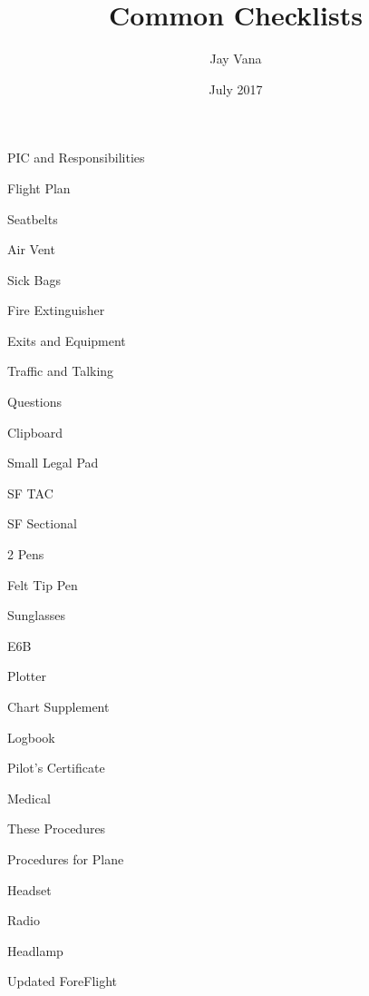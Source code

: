 \documentclass{article}
\title{Common Checklists}
\author{Jay Vana}
\date{July 2017}
\begin{document}
  


  \begin{multicols*}{3}


    \begin{clitemize}
      \item PIC and Responsibilities
      \item Flight Plan
      \item Seatbelts
      \item Air Vent
      \item Sick Bags
      \item Fire Extinguisher
      \item Exits and Equipment
      \item Traffic and Talking
      \item Questions
    \end{clitemize}


    \begin{clitemize}
      \item Clipboard
      \item Small Legal Pad
      \item SF TAC
      \item SF Sectional
      \item 2 Pens
      \item Felt Tip Pen
      \item Sunglasses
      \item E6B
      \item Plotter
      \item Chart Supplement
      \item Logbook
      \item Pilot's Certificate
      \item Medical
      \item These Procedures
      \item Procedures for Plane
      \item Headset
      \item Radio
      \item Headlamp
      \item Updated ForeFlight
    \end{clitemize}



\end{multicols*}
\end{document}
